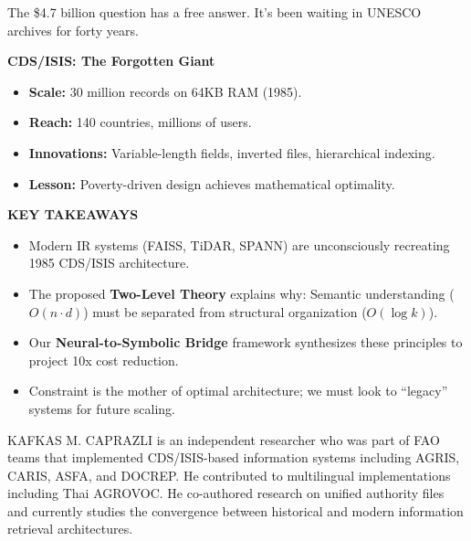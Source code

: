 \documentclass[manuscript,screen,nonacm]{acmart}
\newenvironment{customsidebar}{
  \begin{tcolorbox}[colback=gray!10,colframe=gray!50,arc=0mm,title=\textbf{Sidebar}]
}{
  \end{tcolorbox}
}
\begin{document}
The \$4.7 billion question has a free answer. It's been waiting in UNESCO archives for forty years.

\begin{customsidebar}
\textbf{CDS/ISIS: The Forgotten Giant}
\begin{itemize}
    \item \textbf{Scale:} 30 million records on 64KB RAM (1985).
    \item \textbf{Reach:} 140 countries, millions of users.
    \item \textbf{Innovations:} Variable-length fields, inverted files, hierarchical indexing.
    \item \textbf{Lesson:} Poverty-driven design achieves mathematical optimality.
\end{itemize}
\end{customsidebar}

\begin{customsidebar}
\textbf{KEY TAKEAWAYS}
\begin{itemize}
    \item Modern IR systems (FAISS, TiDAR, SPANN) are unconsciously recreating 1985 CDS/ISIS architecture.
    \item The proposed \textbf{Two-Level Theory} explains why: Semantic understanding ($O(n \cdot d)$) must be separated from structural organization ($O(\log k)$).
    \item Our \textbf{Neural-to-Symbolic Bridge} framework synthesizes these principles to project 10x cost reduction.
    \item Constraint is the mother of optimal architecture; we must look to ``legacy'' systems for future scaling.
\end{itemize}
\end{customsidebar}




\begin{acks}
KAFKAS M. CAPRAZLI is an independent researcher who was part of FAO teams that implemented CDS/ISIS-based information systems including AGRIS, CARIS, ASFA, and DOCREP. He contributed to multilingual implementations including Thai AGROVOC. He co-authored research on unified authority files \cite{caprazli2003} and currently studies the convergence between historical and modern information retrieval architectures.
\end{acks}
\end{document}
